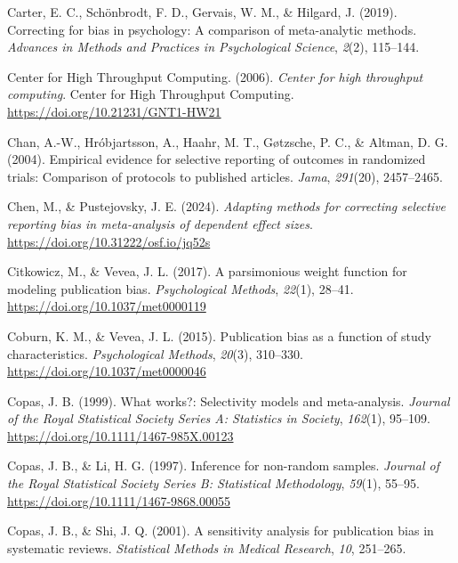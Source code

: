 \documentclass[
  man, donotrepeattitle,floatsintext]{apa7}
\newlength{\cslhangindent}
\newenvironment{CSLReferences}[2] %
 {\begin{list}{}{%
  \setlength{\itemindent}{0pt}
  \setlength{\leftmargin}{0pt}
  \setlength{\parsep}{0pt}
  \ifodd #1
   \setlength{\leftmargin}{\cslhangindent}
   \setlength{\itemindent}{-1\cslhangindent}
  \fi
  \setlength{\itemsep}{#2\baselineskip}}}
 {\end{list}}
\begin{document}
\begin{CSLReferences}{1}{0}
Carter, E. C., Schönbrodt, F. D., Gervais, W. M., \& Hilgard, J. (2019). Correcting for bias in psychology: A comparison of meta-analytic methods. \emph{Advances in Methods and Practices in Psychological Science}, \emph{2}(2), 115--144.

Center for High Throughput Computing. (2006). \emph{Center for high throughput computing}. Center for High Throughput Computing. \url{https://doi.org/10.21231/GNT1-HW21}

Chan, A.-W., Hróbjartsson, A., Haahr, M. T., Gøtzsche, P. C., \& Altman, D. G. (2004). Empirical evidence for selective reporting of outcomes in randomized trials: Comparison of protocols to published articles. \emph{Jama}, \emph{291}(20), 2457--2465.

Chen, M., \& Pustejovsky, J. E. (2024). \emph{Adapting methods for correcting selective reporting bias in meta-analysis of dependent effect sizes}. \url{https://doi.org/10.31222/osf.io/jq52s}

Citkowicz, M., \& Vevea, J. L. (2017). {A parsimonious weight function for modeling publication bias}. \emph{Psychological Methods}, \emph{22}(1), 28--41. \url{https://doi.org/10.1037/met0000119}

Coburn, K. M., \& Vevea, J. L. (2015). {Publication bias as a function of study characteristics}. \emph{Psychological Methods}, \emph{20}(3), 310--330. \url{https://doi.org/10.1037/met0000046}

Copas, J. B. (1999). What works?: {Selectivity} models and meta-analysis. \emph{Journal of the Royal Statistical Society Series A: Statistics in Society}, \emph{162}(1), 95--109. \url{https://doi.org/10.1111/1467-985X.00123}

Copas, J. B., \& Li, H. G. (1997). Inference for non-random samples. \emph{Journal of the Royal Statistical Society Series B: Statistical Methodology}, \emph{59}(1), 55--95. \url{https://doi.org/10.1111/1467-9868.00055}

Copas, J. B., \& Shi, J. Q. (2001). {A sensitivity analysis for publication bias in systematic reviews.} \emph{Statistical Methods in Medical Research}, \emph{10}, 251--265.


\end{CSLReferences}
\end{document}
